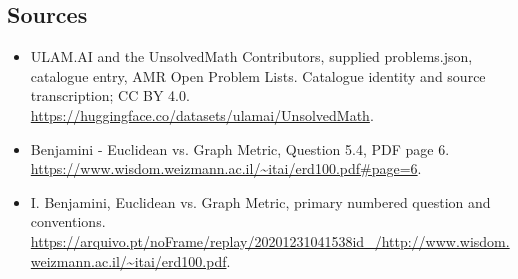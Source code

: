\documentclass[11pt,a4paper]{article}
\begin{document}
\subsection{Sources}
\begin{itemize}
\item[S1] ULAM.AI and the UnsolvedMath Contributors, supplied problems.json, catalogue entry, AMR Open Problem Lists. Catalogue identity and source transcription; CC BY 4.0.
\url{https://huggingface.co/datasets/ulamai/UnsolvedMath}.
\item[S2] Benjamini - Euclidean vs. Graph Metric, Question 5.4, PDF page 6. 
\url{https://www.wisdom.weizmann.ac.il/~itai/erd100.pdf#page=6}.
\item[S3] I. Benjamini, Euclidean vs. Graph Metric, primary numbered question and conventions.
\url{https://arquivo.pt/noFrame/replay/20201231041538id_/http://www.wisdom.weizmann.ac.il/~itai/erd100.pdf}.
\end{itemize}
\end{document}
